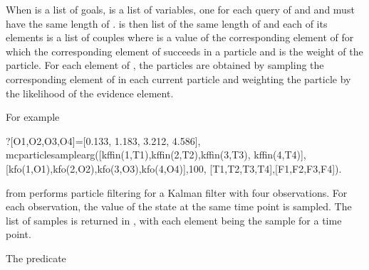 \documentclass[letterpaper,10pt,english]{sphinxmanual}
\begin{document}
When  is a list of goals,  is a list of variables, one for each query of  and  and  must have the same length of .
 is then list of the same length of  and each of its elements is a list of couples  where  is a value of the corresponding element of  for which the corresponding element of  succeeds in a particle and  is the weight of the particle.
For each element of , the particles are obtained by sampling the corresponding element of  in each current particle and weighting the particle by the likelihood of the evidence element.

For example

\begin{sphinxVerbatim}[commandchars=\\\{\}]
?\PYGZhy{}[O1,O2,O3,O4]=[\PYGZhy{}0.133, \PYGZhy{}1.183, \PYGZhy{}3.212, \PYGZhy{}4.586],
mc\PYGZus{}particle\PYGZus{}sample\PYGZus{}arg([kf\PYGZus{}fin(1,T1),kf\PYGZus{}fin(2,T2),kf\PYGZus{}fin(3,T3),
kf\PYGZus{}fin(4,T4)],
[kf\PYGZus{}o(1,O1),kf\PYGZus{}o(2,O2),kf\PYGZus{}o(3,O3),kf\PYGZus{}o(4,O4)],100,
[T1,T2,T3,T4],[F1,F2,F3,F4]).
\end{sphinxVerbatim}

from  performs particle filtering for a Kalman filter with four observations.
For each observation, the value of the state at the same time point is sampled.
The list of samples is returned in \sphinxcode{\sphinxupquote{{[}F1,F2,F3,F4{]}}}, with each element being the sample for a time point.

The predicate

\begin{sphinxVerbatim}[commandchars=\\\{\}]
  
\end{sphinxVerbatim}
\end{document}
